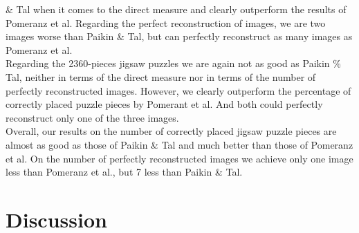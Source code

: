 \documentclass[]{report}
\begin{document}
\& Tal when it comes to the direct measure and clearly outperform the results
of Pomeranz et al. Regarding the perfect reconstruction of images, we are two
images worse than Paikin \& Tal, but can perfectly reconstruct as many images as
Pomeranz et al. \\
Regarding the 2360-pieces jigsaw puzzles we are again not as good as Paikin \%
Tal, neither in terms of the direct measure nor in terms of the number of
perfectly reconstructed images. However, we clearly outperform the percentage of
correctly placed puzzle pieces by Pomerant et al. And both could perfectly
reconstruct only one of the three images. \\
Overall, our results on the number of correctly placed jigsaw puzzle pieces are
almost as good as those of Paikin \& Tal and much better than those of Pomeranz
et al. On the number of perfectly reconstructed images we achieve only one image
less than Pomeranz et al., but 7 less than Paikin \& Tal.

\chapter{Discussion}

\nocite{*}



\end{document}
